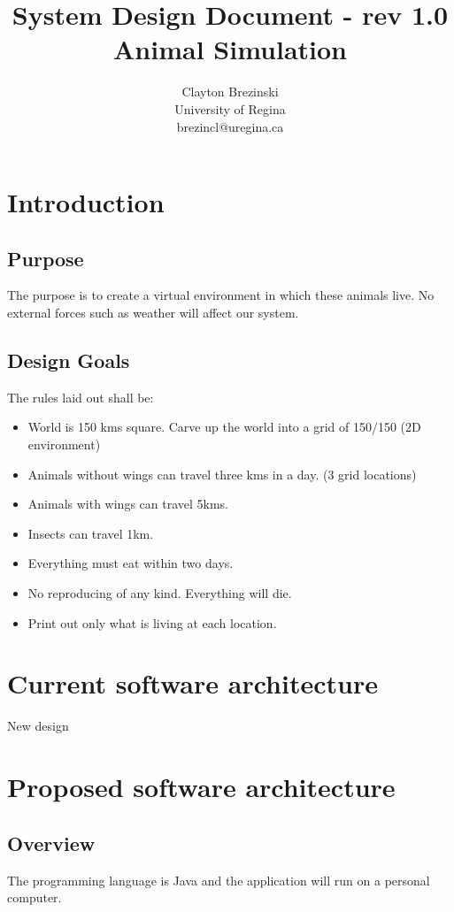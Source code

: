 \documentclass[11pt]{article}
\title{System Design Document - rev 1.0\\
 Animal Simulation}
\author{Clayton Brezinski\\
University of Regina\\
brezincl@uregina.ca}
\begin{document}
         
\maketitle

\section{Introduction}
\subsection{Purpose}
The purpose is to create a virtual environment in which these animals live.  No external forces such as weather will affect our system.
\subsection{Design Goals}
The rules laid out shall be:
\begin{itemize}
  \item World is 150 kms square.  Carve up the world into a grid of 150/150 (2D environment)
  \item Animals without wings can travel three kms in a day. (3 grid locations)
  \item Animals with wings can travel 5kms. 
  \item Insects can travel 1km.
  \item Everything must eat within two days.
  \item No reproducing of any kind.  Everything will die.
  \item Print out only what is living at each location.
\end{itemize}

\section{Current software architecture}
New design

\section{ Proposed software architecture}
\subsection{Overview}
The programming language is Java and the application will run on a personal computer.
\end{document}
